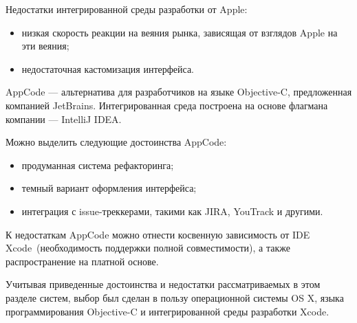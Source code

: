 Недостатки интегрированной среды разработки от Apple:
\begin{itemize}
  \item низкая скорость реакции на веяния рынка, зависящая от взглядов Apple
    на эти веяния;
  \item недостаточная кастомизация интерфейса.
\end{itemize}

AppCode --- альтернатива для разработчиков на языке Objective-C, предложенная
компанией JetBrains. Интегрированная среда построена на основе флагмана
компании --- IntelliJ IDEA.

Можно выделить следующие достоинства AppCode:

\begin{itemize}
  \item продуманная система рефакторинга;
  \item темный вариант оформления интерфейса;
  \item интеграция с issue-треккерами, такими как JIRA, YouTrack и другими.
\end{itemize}

К недостаткам AppCode можно отнести косвенную зависимость от
IDE Xcode~(необходимость поддержки полной совместимости), а также распространение
на платной основе.

Учитывая приведенные достоинства и недостатки рассматриваемых в этом разделе
систем, выбор был сделан в пользу операционной системы OS X, языка программирования
Objective-C и интегрированной среды разработки Xcode.

\pagebreak
